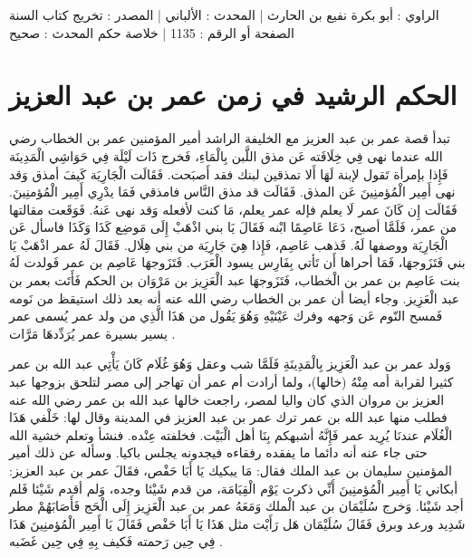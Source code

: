 الراوي : أبو بكرة نفيع بن الحارث | المحدث : الألباني | المصدر : تخريج كتاب السنة
الصفحة أو الرقم : 1135 | خلاصة حكم المحدث : صحيح 

\section{الحكم الرشيد في زمن عمر بن عبد العزيز}

تبدأ قصة عمر بن عبد العزيز مع الخليفة الراشد أمير المؤمنين عمر بن الخطاب رضي الله عندما نهى فِي خِلَافَته عَن مذق اللَّبن بِالْمَاءِ، فَخرج ذَات لَيْلَة فِي حَوَاشِي الْمَدِينَة فَإِذا بإمرأة تَقول لإبنة لَهَا أَلا تمذقين لبنك فقد أَصبَحت. فَقَالَت الْجَارِيَة كَيفَ أمذق وَقد نهى أَمِير الْمُؤمنِينَ عَن المذق. فَقَالَت قد مذق النَّاس فامذقي فَمَا يدْرِي أَمِير الْمُؤمنِينَ. فَقَالَت إِن كَانَ عمر لَا يعلم فإله عمر يعلم، مَا كنت لأفعله وَقد نهى عَنهُ. فَوَقَعت مقالتها من عمر، فَلَمَّا أصبح، دَعَا عَاصِمًا ابْنه فَقَالَ يَا بني اذْهَبْ إِلَى مَوضِع كَذَا وَكَذَا فاسأل عَن الْجَارِيَة ووصفها لَهُ. فَذهب عَاصِم، فَإِذا هِيَ جَارِيَة من بني هِلَال. فَقَالَ لَهُ عمر اذْهَبْ يَا بني فَتَزَوجهَا، فَمَا أحراها أَن تَأتي بِفَارِس يسود الْعَرَب. فَتَزَوجهَا عَاصِم بن عمر فَولدت لَهُ بنت عَاصِم بن عمر بن الْخطاب، فَتَزَوجهَا عبد الْعَزِيز بن مَرْوَان بن الحكم فَأَتَت بعمر بن عبد الْعَزِيز. وجاء أيضا أن عمر بن الخطاب رضي الله عنه أنه بعد ذلك استيقظ من نَومه فَمسح النّوم عَن وَجهه وفرك عَيْنَيْهِ وَهُوَ يَقُول من هَذَا الَّذِي من ولد عمر يُسمى عمر يسير بسيرة عمر يُرَدِّدهَا مَرَّات \cite{ibnAbdAlHakam_OmarIbnAbdAlAziz}.

وَولد عمر بن عبد الْعَزِيز بِالْمَدِينَةِ فَلَمَّا شب وعقل وَهُوَ غُلَام كَانَ يَأْتِي عبد الله بن عمر كثيرا لقرابة أمه مِنْهُ (خالها)، ولما أرادت أم عمر أن تهاجر إلى مصر لتلحق بزوجها عبد العزيز بن مروان الذي كان واليا لمصر، راجعت خالها عبد الله بن عمر رضي الله عنه فطلب منها عبد الله بن عمر ترك عمر بن عبد العزيز في المدينة وقال لها: خَلْفي هَذَا الْغُلَام عندنَا يُرِيد عمر فَإِنَّهُ أشبهكم بِنَا أهل الْبَيْت. فخلفته عِنْده. فنشأ وتعلم خشية الله حتى جاء عنه أنه دائما ما يفقده رفقاءه فيجدونه يجلس باكيا. وسأله عن ذلك أمير المؤمنين سليمان بن عبد الملك فقال: مَا يبكيك يَا أَبَا حَفْص، فقَالَ عمر بن عبد العزيز: أبكاني يَا أَمِير الْمُؤمنِينَ أَنِّي ذكرت يَوْم الْقِيَامَة، من قدم شَيْئا وجده، وَلم أقدم شَيْئا فَلم أجد شَيْئا. وَخرج سُلَيْمَان بن عبد الْملك وَمَعَهُ عمر بن عبد الْعَزِيز إِلَى الْحَج فَأَصَابَهُمْ مطر شَدِيد ورعد وبرق فَقَالَ سُلَيْمَان هَل رَأَيْت مثل هَذَا يَا أَبَا حَفْص فَقَالَ يَا أَمِير الْمُؤمنِينَ هَذَا فِي حِين رَحمته فَكيف بِهِ فِي حِين غَضَبه \cite{ibnAbdAlHakam_OmarIbnAbdAlAziz}.

